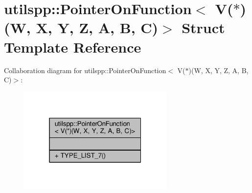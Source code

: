 \hypertarget{structutilspp_1_1PointerOnFunction_3_01V_07_5_08_07W_00_01X_00_01Y_00_01Z_00_01A_00_01B_00_01C_08_4}{\section{utilspp\-:\-:Pointer\-On\-Function$<$ V($\ast$)(W, X, Y, Z, A, B, C)$>$ Struct Template Reference}
\label{structutilspp_1_1PointerOnFunction_3_01V_07_5_08_07W_00_01X_00_01Y_00_01Z_00_01A_00_01B_00_01C_08_4}
}


Collaboration diagram for utilspp\-:\-:Pointer\-On\-Function$<$ V($\ast$)(W, X, Y, Z, A, B, C)$>$\-:
\nopagebreak
\begin{figure}[H]
\begin{center}
\leavevmode
\includegraphics[width=220pt]{structutilspp_1_1PointerOnFunction_3_01V_07_5_08_07W_00_01X_00_01Y_00_01Z_00_01A_00_01B_00_01C_08_4__coll__graph}
\end{center}
\end{figure}
